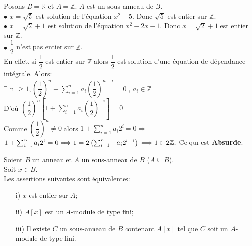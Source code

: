 \begin{monexemple}
	Posons $B = \mathbb{R}$ et $A = \mathbb{Z}$. $A$ est un sous-anneau de $B$.\\
	$\bullet$ $x = \sqrt{5}$ est solution de l'équation $x^2 - 5$. Donc $\sqrt{5}$ est entier sur $\mathbb{Z}$.\\
	$\bullet$ $x = \sqrt{2}+1$ est solution de l'équation $x^2 - 2x -1$. Donc $x = \sqrt{2}+1$ est entier sur $\mathbb{Z}$.\\
	$\bullet$ $\dfrac{1}{2}$ n'est pas entier sur $\mathbb{Z}$.\\
	En effet, si $\dfrac{1}{2}$ est entier sur $\mathbb{Z}$ alors $\dfrac{1}{2}$ est solution d'une équation de dépendance intégrale. Alors: \\
	$\exists$ n $\geq 1 , \left(\dfrac{1}{2} \right)^n + \sum_{i=1}^{n} a_i \left(\dfrac{1}{2} \right)^{n-i} = 0$ , $a_i \in\mathbb{Z}$\\
	D'où $\left(\dfrac{1}{2} \right)^n \left[1+\sum_{i=1}^{n} a_i \left(\dfrac{1}{2} \right)^{-i}\right] = 0$\\
	Comme $\left(\dfrac{1}{2} \right)^n \neq 0$ alors $1+\sum_{i=1}^{n} a_i2^{i} = 0\Longrightarrow$ $1+\sum_{i=1}^{n} a_i2^{i} = 0 \Longrightarrow 1 = 2\left(\sum_{i=1}^{n} -a_i 2^{i-1}\right)\\ \Longrightarrow 1\in 2\mathbb{Z}.$ Ce qui est \textbf{Absurde}. 
\end{monexemple}
\begin{maproposition}
	Soient $B$ un anneau et $A$ un sous-anneau de $B$ ($A \subseteq B$).\\
	Soit $x \in B$. \\
	Les assertions suivantes sont équivalentes:
	\begin{enumerate}
		\item[i)]$x$ est entier sur $A$;
		\item[ii)]$A\left[ x\right]$ est un $A$-module de type fini;
		\item[iii)]Il existe $C$ un sous-anneau de $B$ contenant $A\left[ x\right]$ tel que $C$ soit un $A$-module de type fini.
	\end{enumerate}
\end{maproposition}
